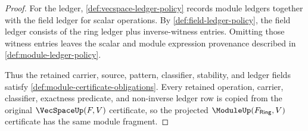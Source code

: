 \begin{proof}
For the ledger, \autoref{def:vecspace-ledger-policy} records module ledgers together with the field ledger for scalar operations. By \autoref{def:field-ledger-policy}, the field ledger consists of the ring ledger plus inverse-witness entries. Omitting those witness entries leaves the scalar and module expression provenance described in \autoref{def:module-ledger-policy}.

Thus the retained carrier, source, pattern, classifier, stability, and ledger fields satisfy \autoref{def:module-certificate-obligations}. Every retained operation, carrier, classifier, exactness predicate, and non-inverse ledger row is copied from the original $\VecSpaceUp(F,V)$ certificate, so the projected $\ModuleUp(F_{\mathsf{Ring}},V)$ certificate has the same module fragment.
\end{proof}

